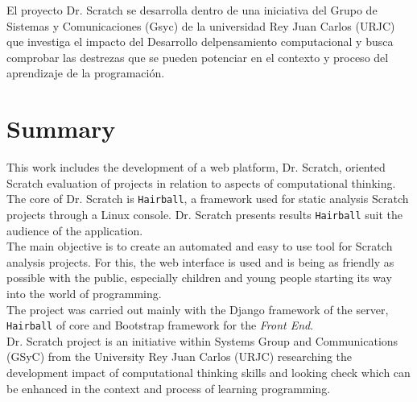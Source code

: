 \documentclass[a4paper, 12pt]{book}
\begin{document}
El proyecto Dr. Scratch se desarrolla dentro de una iniciativa del Grupo de Sistemas
y Comunicaciones (Gsyc) de la universidad Rey Juan Carlos (URJC) que investiga el
impacto del Desarrollo delpensamiento computacional y busca comprobar las destrezas
que se pueden potenciar en el contexto y proceso del aprendizaje de la programación.




\chapter*{Summary}

This work includes the development of a web platform, Dr. Scratch, oriented
Scratch evaluation of projects in relation to aspects of computational thinking.
The core of Dr. Scratch is \texttt {Hairball}, a framework used for static analysis
Scratch projects through a Linux console. Dr. Scratch presents results
\texttt{Hairball} suit the audience of the application. \\

The main objective is to create an automated and easy to use tool for Scratch 
analysis projects. For this, the web interface is used and is being as friendly 
as possible with the public, especially children and young people starting
its way into the world of programming. \\

The project was carried out mainly with the Django framework of the server, 
\texttt{Hairball} of core and Bootstrap framework for the \emph{Front End}. \\

Dr. Scratch project is an initiative within Systems Group and Communications
(GSyC) from the University Rey Juan Carlos (URJC) researching the
development impact of computational thinking skills and looking check
which can be enhanced in the context and process of learning programming.



\end{document}
